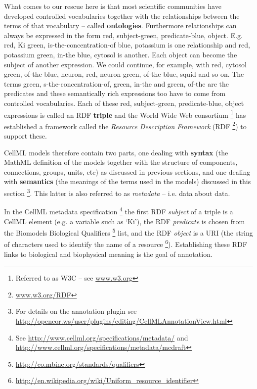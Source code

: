 \documentclass[a4paper,10pt,english]{sphinxmanual}
\renewcommand{\DUspan}[2]{#1, #2}
\begin{document}
What comes to our rescue here is that most scientific communities have
developed controlled vocabularies together with the relationships
between the terms of that vocabulary – called \textbf{ontologies}.
Furthermore relationships can always be expressed in the form
\DUspan{red}{subject}-\DUspan{green}{predicate}-\DUspan{blue}{object}. E.g. \DUspan{red}{Ki}
\DUspan{green}{is-the-concentration-of} \DUspan{blue}{potassium} is one relationship and
\DUspan{red}{potassium} \DUspan{green}{in-the} \DUspan{blue}{cytosol} is another. Each object can become
the subject of another expression. We could continue, for example, with
\DUspan{red}{cytosol} \DUspan{green}{of-the} \DUspan{blue}{neuron}, \DUspan{red}{neuron} \DUspan{green}{of-the} \DUspan{blue}{squid} and so
on. The terms \DUspan{green}{s-the-concentration-of}, \DUspan{green}{in-the} and \DUspan{green}{of-the} are
the predicates and these semantically rich expressions too have to come
from controlled vocabularies. Each of these
\DUspan{red}{subject}-\DUspan{green}{predicate}-\DUspan{blue}{object} expressions is called an RDF \textbf{triple}
and the World Wide Web consortium \footnote[1]{
Referred to as W3C – see \href{http://www.w3.org}{www.w3.org}
} has established a framework
called the \emph{Resource Description Framework} (RDF \footnote[2]{
\href{http://www.w3.org/RDF}{www.w3.org/RDF}
}) to support
these.

CellML models therefore contain two parts, one dealing with \textbf{syntax}
(the MathML definition of the models together with the structure of
components, connections, groups, units, etc) as discussed in previous
sections, and one dealing with \textbf{semantics} (the meanings of the
terms used in the models) discussed in this section \footnote[3]{
For details on the annotation plugin see \href{http://opencor.ws/user/plugins/editing/CellMLAnnotationView.html}{http://opencor.ws/user/plugins/editing/CellMLAnnotationView.html}
}. This latter
is also referred to as \emph{metadata} – i.e. data about data.

In the CellML metadata specification \footnote[4]{
See \href{http://www.cellml.org/specifications/metadata/}{http://www.cellml.org/specifications/metadata/} and \href{http://www.cellml.org/specifications/metadata/mcdraft}{http://www.cellml.org/specifications/metadata/mcdraft}
} the first RDF \emph{subject} of a
triple is a CellML element (e.g. a variable such as ‘Ki’), the RDF
\emph{predicate} is chosen from the Biomodels Biological Qualifiers \footnote[5]{
\href{http://co.mbine.org/standards/qualifiers}{http://co.mbine.org/standards/qualifiers}
}
list, and the RDF \emph{object} is a URI (the string of characters used to
identify the name of a resource \footnote[6]{
\href{http://en.wikipedia.org/wiki/Uniform\_resource\_identifier}{http://en.wikipedia.org/wiki/Uniform\_resource\_identifier}
}). Establishing these RDF links to
biological and biophysical meaning is the goal of annotation.
\end{document}
